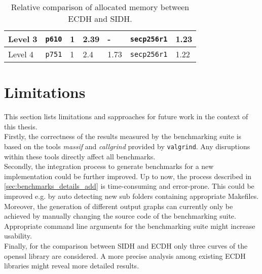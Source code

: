 \begin{table}[H]
\begin{tabular}{|K{1.8cm}|K{1.8cm}|K{1.8cm}|K{2cm}|K{1.8cm}|K{1.8cm}|K{1.8cm}|}
{}Level 3                                                                                                                                                 & {}\texttt{p610}                                                                    & {}1 & 2.39                                                                                                         & -               & {}\texttt{secp256r1}                                                               & 1.23               \\ 
\hline
{}Level 4                                                                                                                                                 & {}\texttt{p751}                                                                    & {}1 & 2.4                                                                                                          & 1.73            & {}\texttt{secp256r1}                                                               & 1.22               \\
\hline
\end{tabular}
\caption[Comparing allocated memory between \gls{ECDH} and \gls{SIDH}]{Relative comparison of allocated memory between \gls{ECDH} and \gls{SIDH}.}
\label{tab:conclusion_ecdh_sidh_mem}
\end{table}

\section{Limitations}\label{sec:conclusion_limits}

This section lists limitations and sapproaches for future work in the context of this thesis.
\\
Firstly, the correctness of the results measured by the benchmarking suite is based on the tools \textit{massif} and \textit{callgrind} provided by \texttt{valgrind}. Any disruptions within these tools directly affect all benchmarks.
\\
Secondly, the integration process to generate benchmarks for a new implementation could be further improved. Up to now, the process described in \ref{sec:benchmarks_details_add} is time-consuming and error-prone. This could be improved e.g. by auto detecting new sub folders containing appropriate Makefiles. Moreover, the generation of different output graphs can currently only be achieved by manually changing the source code of the benchmarking suite. Appropriate command line arguments for the benchmarking suite might increase usability.
\\
Finally, for the comparison between \gls{SIDH} and \gls{ECDH} only three curves of the  \gls{openssl} library are considered. A more precise analysis among existing \gls{ECDH} libraries might reveal more detailed results.